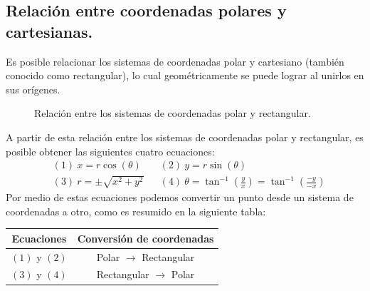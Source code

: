 \documentclass[12pt]{article}
\begin{document}
\subsection{Relación entre coordenadas polares y cartesianas.}

Es posible relacionar los sistemas de coordenadas polar y cartesiano (también conocido como rectangular), lo cual geométricamente se puede lograr al unirlos en sus orígenes.

\newpage

\begin{figure}[hbt!]
\centering


\caption{Relación entre los sistemas de coordenadas polar y rectangular.}

\end{figure}

A partir de esta relación entre los sistemas de coordenadas polar y rectangular, es posible obtener las siguientes cuatro ecuaciones:
\begin{align*}
  &(1) \ x = r \cos(\theta)       & &(2) \ y = r \sin(\theta) \\
  &(3) \ r = \pm \sqrt{x^{2} + y^{2}} & &(4) \ \theta = \tan^{-1}\left(\frac{y}{x}\right) = \tan^{-1}\left(\frac{-y}{-x}\right)
\end{align*}
Por medio de estas ecuaciones podemos convertir un punto desde un sistema de coordenadas a otro, como es resumido en la siguiente tabla:

\begin{table}[hbt!]
\centering

\begin{tabular}{c c}
\hline
\hline
Ecuaciones & Conversión de coordenadas \\
\hline
$(1)$ y $(2)$ & Polar $\rightarrow$ Rectangular \\
$(3)$ y $(4)$ & Rectangular $\rightarrow$ Polar \\
\hline
\hline
\end{tabular}

\end{table}
\end{document}
